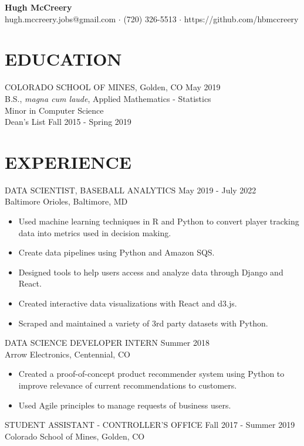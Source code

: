 \documentclass[11pt]{res} %
\begin{document}
 
	\begin{center}
 		\textbf{\LARGE Hugh McCreery} \\
 		hugh.mccreery.jobs@gmail.com $\cdot$ (720) 326-5513 $\cdot$ https://github.com/hbmccreery
	\end{center}
\vspace{-0.6in}
\begin{resume}
\hrulefill
\vspace{-0.2in}                                  
\section{EDUCATION} 
 \noindent COLORADO SCHOOL OF MINES, Golden, CO \hfill May 2019 \\
B.S., \textit{magna cum laude}, Applied Mathematics - Statistics\\
Minor in Computer Science \\
Dean's List \hfill Fall 2015 - Spring 2019 \\
\vspace{-0.1in}
\hrulefill
\vspace{-0.1in}  
\section{EXPERIENCE} 

DATA SCIENTIST, BASEBALL ANALYTICS \hfill May 2019  - July 2022	\\
Baltimore Orioles, Baltimore, MD

\begin{itemize}
	\item Used machine learning techniques in R and Python to convert player tracking data into metrics used in decision making.
	\item Create data pipelines using Python and Amazon SQS.
	\item Designed tools to help users access and analyze data through Django and React.
	\item Created interactive data visualizations with React and d3.js.
	\item Scraped and maintained a variety of 3rd party datasets with Python.
\end{itemize}
\vspace{-0.15in}  
DATA SCIENCE DEVELOPER INTERN \hfill Summer 2018 \\
Arrow Electronics, Centennial, CO

\begin{itemize}
	\item Created a proof-of-concept product recommender system using Python to improve relevance of current recommendations to customers.
	\item Used Agile principles to manage requests of business users.
\end{itemize}
\vspace{-0.15in}  
STUDENT ASSISTANT - CONTROLLER'S OFFICE \hfill Fall 2017 - Summer 2019 \\
Colorado School of Mines, Golden, CO 


\end{resume}
\end{document}
